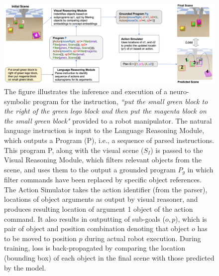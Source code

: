 \begin{figure}
    \centering    
    \includegraphics[width=15cm]{figures/schematic.png}
    \caption{
    \footnotesize{
    The figure illustrates the inference and execution 
    of a neuro-symbolic program for the instruction, 
    \emph{``put the small green block to the right of the green lego block and then put the magenta block on the small green block"} provided to a robot manipulator. 
    The natural language instruction is input to the Language Reasoning Module, which outputs a Program (P), i.e., a sequence of parsed instructions. 
    This program P, along with the visual scene ($S_I$) is passed to the Visual Reasoning Module, which filters relevant objects from the scene, and uses them to the output a grounded program $P_g$ in which filter commands have been replaced by specific object references. 
    The Action Simulator takes the action identifier (from the parser), locations of object arguments as output by visual reasoner, and produces resulting location of argument 1 object of the action command. It also results in outputting of sub-goals ($o,p$), which is pair of object and position combination denoting that object $o$ has to be moved to position $p$ during actual robot execution. During training, loss is back-propagated by comparing the location (bounding box) of each object in the final scene with those predicted by the model.}}
    \label{fig:schematic}
\end{figure}


\fi